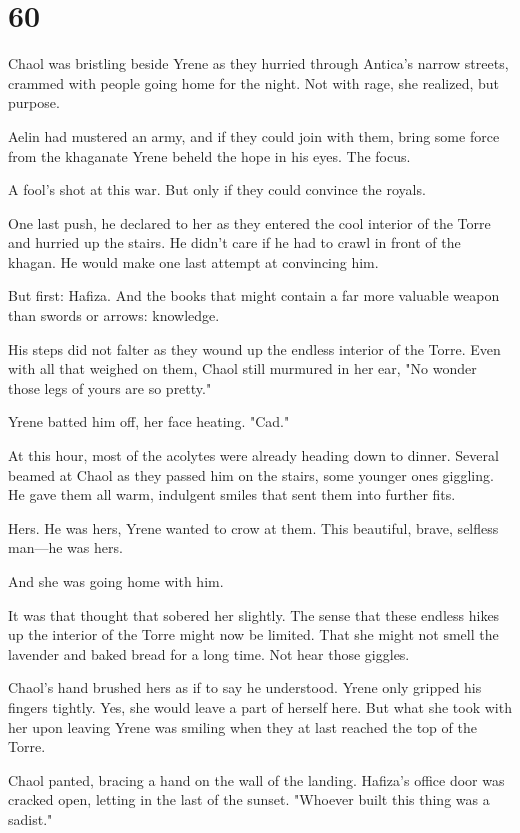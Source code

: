 
\chapter{60}

Chaol was bristling beside Yrene as they hurried through Antica's narrow streets, crammed with people going home for the night. Not with rage, she realized, but purpose.

Aelin had mustered an army, and if they could join with them, bring some force from the khaganate  Yrene beheld the hope in his eyes. The focus.

A fool's shot at this war. But only if they could convince the royals.

One last push, he declared to her as they entered the cool interior of the Torre and hurried up the stairs. He didn't care if he had to crawl in front of the khagan. He would make one last attempt at convincing him.

But first: Hafiza. And the books that might contain a far more valuable weapon than swords or arrows: knowledge.

His steps did not falter as they wound up the endless interior of the Torre. Even with all that weighed on them, Chaol still murmured in her ear, "No wonder those legs of yours are so pretty."

Yrene batted him off, her face heating. "Cad."

At this hour, most of the acolytes were already heading down to dinner. Several beamed at Chaol as they passed him on the stairs, some younger ones giggling. He gave them all warm, indulgent smiles that sent them into further fits.

Hers. He was hers, Yrene wanted to crow at them. This beautiful, brave, selfless man---he was hers.

And she was going home with him.

It was that thought that sobered her slightly. The sense that these endless hikes up the interior of the Torre might now be limited. That she might not smell the lavender and baked bread for a long time. Not hear those giggles.

Chaol's hand brushed hers as if to say he understood. Yrene only gripped his fingers tightly. Yes, she would leave a part of herself here. But what she took with her upon leaving  Yrene was smiling when they at last reached the top of the Torre.

Chaol panted, bracing a hand on the wall of the landing. Hafiza's office door was cracked open, letting in the last of the sunset. "Whoever built this thing was a sadist."

